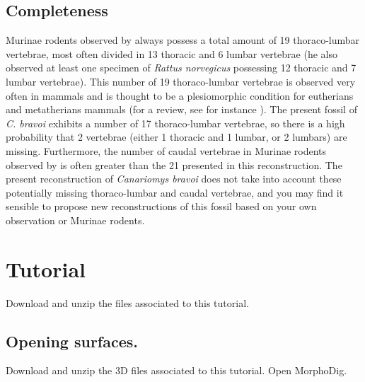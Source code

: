\documentclass[12pt, a4paper]{book}
\begin{document}
\subsection{Completeness}
Murinae rodents observed by \citet{Owen1853} always possess a total amount of 19 thoraco-lumbar
vertebrae, most often divided in 13 thoracic and 6 lumbar vertebrae (he also observed at least one
specimen of \textit{Rattus norvegicus} possessing 12 thoracic and 7 lumbar vertebrae). This number of 19
thoraco-lumbar vertebrae is observed very often in mammals and is thought to be a plesiomorphic
condition for eutherians and metatherians mammals (for a review, see for instance \citealp{SanchezVillagra2007}). The present fossil of \textit{C. bravoi} exhibits a number of 17 thoraco-lumbar vertebrae, so there is a high probability that 2 vertebrae (either 1 thoracic and 1 lumbar, or 2 lumbars) are missing.
Furthermore, the number of caudal vertebrae in Murinae rodents observed by \citet{Owen1853} is often greater than the 21 presented in this reconstruction. The present reconstruction of \textit{Canariomys bravoi} does not take into account these potentially missing thoraco-lumbar and caudal vertebrae, and
you may find it sensible to propose new reconstructions of this fossil based on your own observation or Murinae rodents.

\section{Tutorial}
		Download and unzip the files associated to this tutorial.
\subsection{Opening surfaces.}

Download and unzip the 3D files associated to this tutorial. Open MorphoDig.
\end{document}
